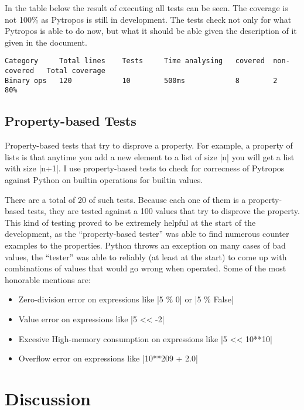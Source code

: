In the table below the result of executing all tests can be seen. The
coverage is not 100\% as Pytropos is still in development. The tests
check not only for what Pytropos is able to do now, but what it should
be able given the description of it given in the document.

\begin{verbatim}
Category     Total lines    Tests     Time analysing   covered  non-covered   Total coverage
Binary ops   120            10        500ms            8        2             80%
\end{verbatim}

\subsection{Property-based Tests}\label{property-based-tests}

Property-based tests that try to disprove a property. For example, a
property of lists is that anytime you add a new element to a list of
size \pycode|n| you will get a list with size \pycode|n+1|. I use
property-based tests to check for correcness of Pytropos against Python
on builtin operations for builtin values.

There are a total of 20 of such tests. Because each one of them is a
property-based tests, they are tested against a 100 values that try to
disprove the property. This kind of testing proved to be extremely
helpful at the start of the development, as the \enquote{property-based
tester} was able to find numerous counter examples to the properties.
Python throws an exception on many cases of bad values, the
\enquote{tester} was able to reliably (at least at the start) to come up
with combinations of values that would go wrong when operated. Some of
the most honorable mentions are:

\begin{itemize}
\tightlist
\item
  Zero-division error on expressions like \pycode|5 \% 0| or
  \pycode|5 \% False|
\item
  Value error on expressions like \pycode|5 << -2|
\item
  Excesive High-memory consumption on expressions like
  \pycode|5 << 10**10|
\item
  Overflow error on expressions like \pycode|10**209 + 2.0|
\end{itemize}

\section{Discussion}\label{discussion}

